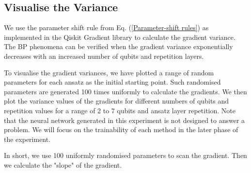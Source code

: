 \subsection{Visualise the Variance}
We use the parameter shift rule from Eq. (\ref{Parameter-shift rules}) as implemented in the Qiskit Gradient library to calculate the gradient variance.
The BP phenomena can be verified when the gradient variance exponentially decreases with an increased number of qubits and repetition layers.

To visualise the gradient variances, we have plotted a range of random parameters for each ansatz as the initial starting point.
Such randomised parameters are generated 100 times uniformly to calculate the gradients.
We then plot the variance values of the gradients for different numbers of qubits and repetition values for a range of 2 to 7 qubits and ansatz layer repetition.
Note that the neural network generated in this experiment is not designed to answer a problem.
We will focus on the trainability of each method in the later phase of the experiment.

In short, we use 100 uniformly randomised parameters to scan the gradient.
Then we calculate the "slope" of the gradient.